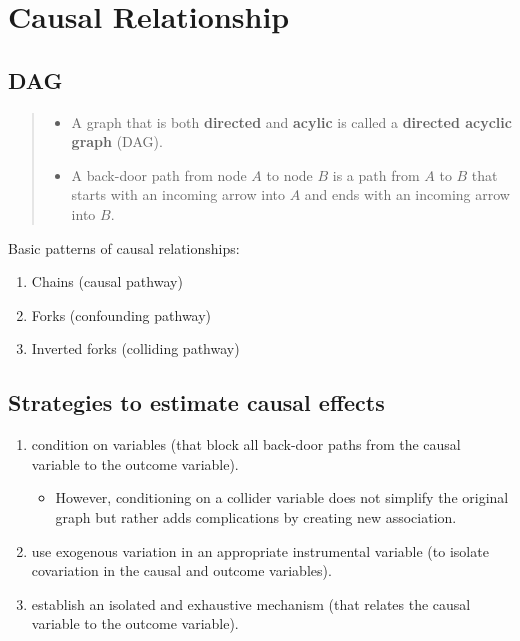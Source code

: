 \documentclass[
]{ctexart}
\author{}
\date{}
\providecommand{\tightlist}{%
  \setlength{\itemsep}{0pt}\setlength{\parskip}{0pt}}
\newcommand{\0}{\textbf 0}
\newcommand{\1}{\textbf 1}
\begin{document}
\renewcommand*\contentsname{目录}
{
\setcounter{tocdepth}{3}
\tableofcontents
}
\hypertarget{causal-relationship}{%
\section{Causal Relationship}\label{causal-relationship}}

\hypertarget{dag}{%
\subsection{DAG}\label{dag}}

\begin{quote}
\begin{itemize}
\tightlist
\item
  A graph that is both \textbf{directed} and \textbf{acylic} is called a
  \textbf{directed acyclic graph} (DAG).
\item
  A back-door path from node \(A\) to node \(B\) is a path from \(A\) to
  \(B\) that starts with an incoming arrow into \(A\) and ends with an
  incoming arrow into \(B\).
\end{itemize}
\end{quote}

Basic patterns of causal relationships:

\begin{enumerate}
\def\labelenumi{\arabic{enumi}.}
\tightlist
\item
  Chains (causal pathway)
\item
  Forks (confounding pathway)
\item
  Inverted forks (colliding pathway)
\end{enumerate}

\hypertarget{strategies-to-estimate-causal-effects}{%
\subsection{Strategies to estimate causal
effects}\label{strategies-to-estimate-causal-effects}}

\begin{enumerate}
\def\labelenumi{\arabic{enumi}.}
\tightlist
\item
  condition on variables (that block all back-door paths from the causal
  variable to the outcome variable).

  \begin{itemize}
  \tightlist
  \item
    However, conditioning on a collider variable does not simplify the
    original graph but rather adds complications by creating new
    association.
  \end{itemize}
\item
  use exogenous variation in an appropriate instrumental variable (to
  isolate covariation in the causal and outcome variables).
\item
  establish an isolated and exhaustive mechanism (that relates the
  causal variable to the outcome variable).
\end{enumerate}
\end{document}
